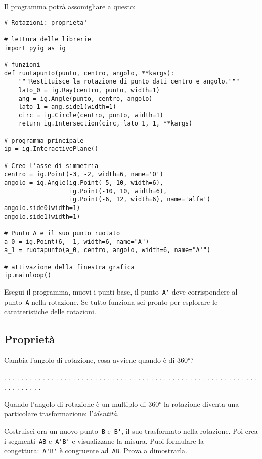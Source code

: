 Il programma potrà assomigliare a questo:

\begin{lstlisting}
# Rotazioni: proprieta'

# lettura delle librerie
import pyig as ig

# funzioni
def ruotapunto(punto, centro, angolo, **kargs):
    """Restituisce la rotazione di punto dati centro e angolo."""
    lato_0 = ig.Ray(centro, punto, width=1)
    ang = ig.Angle(punto, centro, angolo)
    lato_1 = ang.side1(width=1)
    circ = ig.Circle(centro, punto, width=1)
    return ig.Intersection(circ, lato_1, 1, **kargs)
  
# programma principale
ip = ig.InteractivePlane()

# Creo l'asse di simmetria
centro = ig.Point(-3, -2, width=6, name='O')
angolo = ig.Angle(ig.Point(-5, 10, width=6),
                  ig.Point(-10, 10, width=6),
                  ig.Point(-6, 12, width=6), name='alfa')
angolo.side0(width=1)
angolo.side1(width=1)

# Punto A e il suo punto ruotato
a_0 = ig.Point(6, -1, width=6, name="A")
a_1 = ruotapunto(a_0, centro, angolo, width=6, name="A'")

# attivazione della finestra grafica
ip.mainloop()
\end{lstlisting}

Esegui il programma, muovi i punti base, il punto~\lstinline{A'} deve
corrispondere al punto~\lstinline{A} nella rotazione.
Se tutto funziona sei pronto per esplorare le caratteristiche delle
rotazioni.


\subsection{Proprietà}

Cambia l'angolo di rotazione, cosa avviene quando è di 360°?

. . . . . . . . . . . . . . . . . . . . . . . . . . . . . . . . . . . . . . . .
. . . . . . . . . . . . . . . . . . . . . . . . . . . .

Quando l'angolo di rotazione è un multiplo di 360° la rotazione diventa una
particolare trasformazione: l'\emph{identità}.

Costruisci ora un nuovo punto~\lstinline{B} e~\lstinline{B'}, il suo trasformato 
nella rotazione. 
Poi crea i segmenti~\lstinline{AB} e~\lstinline{A'B'} e visualizzane 
la misura.
Puoi formulare la congettura:~\lstinline{A'B'} è congruente ad~\lstinline{AB}.
Prova a dimostrarla.

